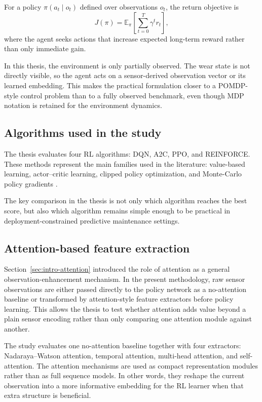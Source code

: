 \documentclass[12pt,oneside]{book}
\begin{document}
For a policy $\pi(a_t\mid o_t)$ defined over observations $o_t$, the return objective is
\begin{equation}
J(\pi) = \mathbb{E}_{\pi}\left[\sum_{t=0}^{T} \gamma^t r_t\right],
\end{equation}
where the agent seeks actions that increase expected long-term reward rather than only immediate gain.

In this thesis, the environment is only partially observed. The wear state is not directly visible, so the agent acts on a sensor-derived observation vector or its learned embedding. This makes the practical formulation closer to a POMDP-style control problem than to a fully observed benchmark, even though MDP notation is retained for the environment dynamics.

\subsection{Algorithms used in the study}
The thesis evaluates four RL algorithms: \textsc{DQN}, \textsc{A2C}, \textsc{PPO}, and \textsc{REINFORCE}. These methods represent the main families used in the literature: value-based learning, actor--critic learning, clipped policy optimization, and Monte-Carlo policy gradients \cite{Mnih2015, Schulman2017, Williams1992}.

The key comparison in the thesis is not only which algorithm reaches the best score, but also which algorithm remains simple enough to be practical in deployment-constrained predictive maintenance settings.

\subsection{Attention-based feature extraction}
Section~\ref{sec:intro-attention} introduced the role of attention as a general observation-enhancement mechanism. In the present methodology, raw sensor observations are either passed directly to the policy network as a no-attention baseline or transformed by attention-style feature extractors before policy learning. This allows the thesis to test whether attention adds value beyond a plain sensor encoding rather than only comparing one attention module against another.

The study evaluates one no-attention baseline together with four extractors: Nadaraya--Watson attention, temporal attention, multi-head attention, and self-attention. The attention mechanisms are used as compact representation modules rather than as full sequence models. In other words, they reshape the current observation into a more informative embedding for the RL learner when that extra structure is beneficial.
\end{document}
